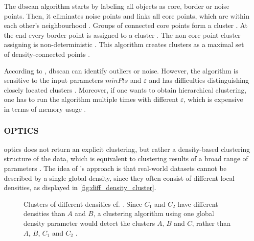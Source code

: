 The \ac{dbscan} algorithm starts by labeling all objects as core, border or noise points.
Then, it eliminates noise points and links all core points, which are within each other's neighbourhood \cite{OPTICS_kMeans_2016}.
Groups of connected core points form a cluster \cite{OPTICS_kMeans_2016}.
At the end every border point is assigned to a cluster \cite{OPTICS_kMeans_2016}.
The non-core point cluster assigning is non-deterministic \cite{OPTICS2013}.
This algorithm creates clusters as a maximal set of density-connected points \cite{OPTICS_kMeans_2016}.

According to \citeauthor{OPTICS_kMeans_2016}, \ac{dbscan} can identify outliers or noise.
However, the algorithm is sensitive to the input parameters $minPts$ and $\varepsilon$ and has difficulties distinguishing closely located clusters \cite{OPTICS_kMeans_2016}.
Moreover, if one wants to obtain hierarchical clustering, one has to run the algorithm multiple times with different $\varepsilon$, which is expensive in terms of memory usage \cite{OPTICS2013}.





\subsubsection{OPTICS}\label{subsec:optics}

\ac{optics} does not return an explicit clustering, but rather a density-based clustering structure of the data, 
which is equivalent to clustering results of a broad range of parameters \cite{OPTICS1999}.
The idea of \citeauthor{OPTICS1999}'s approach is that real-world datasets cannot be described by a single global density, since they often consist of different local densities, 
as displayed in \autoref{fig:diff_density_cluster}.

\begin{figure}[htp] %
    \centering
    
    \caption{Clusters of different densities cf. \cite{OPTICS1999}.
    Since $C_1$ and $C_2$ have different densities than $A$ and $B$, a clustering algorithm using one global density parameter would detect the clusters $A$, $B$ and $C$, 
    rather than $A$, $B$, $C_1$ and $C_2$ .
    }
    \label{fig:diff_density_cluster}
\end{figure}


